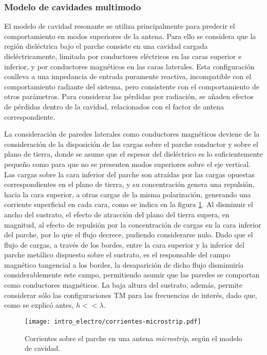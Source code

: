 \subsubsection{Modelo de cavidades multimodo}
\label{subsubsec_microstrip_modeloCavidades}

El modelo de cavidad resonante se utiliza principalmente para predecir el comportamiento en modos superiores de la antena. Para ello se considera que la región dieléctrica bajo el parche consiste en una cavidad cargada dieléctricamente, limitada por conductores eléctricos en las caras superior e inferior, y por conductores magnéticos en las caras laterales. Esta configuración conlleva a una impedancia de entrada puramente reactiva, incompatible con el comportamiento radiante del sistema, pero consistente con el comportamiento de otros parámetros. Para considerar las pérdidas por radiación, se añaden efectos de pérdidas dentro de la cavidad, relacionados con el factor de antena correspondiente.

La consideración de paredes laterales como conductores magnéticos deviene de la consideración de la disposición de las cargas sobre el parche conductor y sobre el plano de tierra, donde se asume que el espesor del dieléctrico es lo suficientemente pequeño como para que no se presenten modos superiores sobre el eje vertical. Las cargas sobre la cara inferior del parche son atraídas por las cargas opuestas correspondientes en el plano de tierra, y su concentración genera una repulsión, hacia la cara superior, a otras cargas de la misma polarización, generando una corriente superficial en cada cara, como se indica en la figura \ref{fig:corrientes-microstrip}. Al disminuir el ancho del sustrato, el efecto de atracción del plano del tierra supera, en magnitud, al efecto de repulsión por la concentración de cargas en la cara inferior del parche, por lo que el flujo decrece, pudiendo considerarse nulo. Dado que el flujo de cargas, a través de los bordes, entre la cara superior y la inferior del parche metálico dispuesto sobre el sustrato, es el responsable del campo magnético tangencial a los bordes, la desaparición de dicho flujo disminuiría considerablemente este campo, permitiendo asumir que las paredes se comportan como conductores magnéticos. La baja altura del sustrato, además, permite considerar sólo las configuraciones TM para las frecuencias de interés, dado que, como se explicó antes, $h<<\lambda$.

\begin{figure}[htp]
	\centering
	\texttt{[image: intro\_electro/corrientes-microstrip.pdf]}
	\caption{Corrientes sobre el parche en una antena \textit{microstrip}, según el modelo de cavidad.}
	\label{fig:corrientes-microstrip}
\end{figure}


